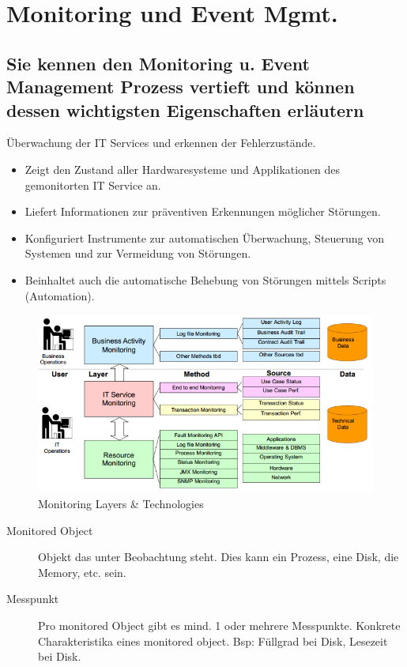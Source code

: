 \chapter{Monitoring und Event Mgmt.}

\section{Sie kennen den Monitoring u. Event Management Prozess vertieft und können dessen wichtigsten Eigenschaften erläutern}

Überwachung der IT Services und erkennen der Fehlerzustände. 

\begin{itemize}
	\item Zeigt den Zustand aller Hardwaresysteme und Applikationen des gemonitorten IT Service an.
	\item Liefert Informationen zur präventiven Erkennungen möglicher Störungen.
	\item Konfiguriert Instrumente zur automatischen Überwachung, Steuerung von Systemen und zur Vermeidung von Störungen.
	\item Beinhaltet auch die automatische Behebung von Störungen mittels Scripts (Automation).
\end{itemize}

\begin{figure}[h!]
\centering
\includegraphics[width=0.7\linewidth]{fig/itil-monitoring-layers}
\caption{Monitoring Layers \& Technologies}
\label{fig:itil-monitoring-layers}
\end{figure}

\begin{description}
	\item[Monitored Object] Objekt das unter Beobachtung steht. Dies kann ein Prozess, eine Disk, die Memory, etc. sein.
	\item[Messpunkt] Pro monitored Object gibt es mind. 1 oder mehrere Messpunkte. Konkrete Charakteristika eines monitored object. Bsp: Füllgrad bei Disk, Lesezeit bei Disk.
\end{description}

